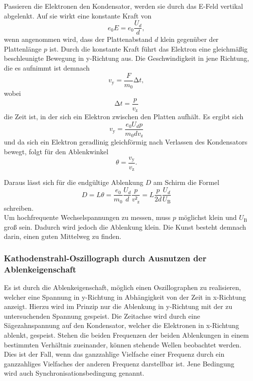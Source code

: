 Passieren die Elektronen den Kondensator, werden sie durch das E-Feld vertikal abgelenkt.
Auf sie wirkt eine konstante Kraft von
\begin{equation}
  e_0 E = e_0 \frac{U_{d}}{d},
\end{equation}
wenn angenommen wird, dass der Plattenabstand $d$ klein gegenüber der Plattenlänge $p$ ist.
Durch die konstante Kraft führt das Elektron eine gleichmäßig beschleunigte Bewegung in y-Richtung aus.
Die Geschwindigkeit in jene Richtung, die es aufnimmt ist demnach
\begin{equation}
  v_{\text{y}} = \frac{F}{m_0} \increment{t},
\end{equation}
wobei
\begin{equation}
  \increment{t} = \frac{p}{v_{\text{z}}}
\end{equation}
die Zeit ist, in der sich ein Elektron zwischen den Platten aufhält.
Es ergibt sich
\begin{equation}
  v_{\text{y}} = \frac{e_0 U_d p}{m_0 d v_{\text{z}}}
\end{equation}
und da sich ein Elektron geradlinig gleichförmig nach Verlassen des Kondensators bewegt, folgt für den Ablenkwinkel
\begin{equation}
  \theta = \frac{v_{\text{y}}}{v_{\text{z}}}.
\end{equation}

Daraus lässt sich für die endgültige Ablenkung $D$ am Schirm die Formel
\begin{equation}
  D = L \theta = \frac{e_0}{m_0} \frac{U_d}{d} \frac{p}{v²_{\text{z}}} = L \frac{p}{2d} \frac{U_d}{U_{\text{B}}}
\end{equation}
schreiben.\\
Um hochfrequente Wechselspannungen zu messen, muss $p$ möglichst klein und $U_{\text{B}}$ groß sein.
Dadurch wird jedoch die Ablenkung klein.
Die Kunst besteht demnach darin, einen guten Mittelweg zu finden.

\subsubsection{Kathodenstrahl-Oszillograph durch Ausnutzen der Ablenkeigenschaft}
Es ist durch die Ablenkeigenschaft, möglich einen Oszillographen zu realisieren, welcher eine Spannung in y-Richtung in Abhängigkeit von der Zeit in x-Richtung anzeigt.
Hierzu wird im Prinzip nur die Ablenkung in y-Richtung mit der zu untersuchenden Spannung gespeist.
Die Zeitachse wird durch eine Sägezahnspannung auf den Kondensator, welcher die Elektronen in x-Richtung ablenkt, gespeist.
Stehen die beiden Frequenzen der beiden Ablenkungen in einem bestimmten Verhältnis zueinander, können stehende Wellen beobachtet werden.
Dies ist der Fall, wenn das ganzzahlige Vielfache einer Frequenz durch ein ganzzahliges Vielfaches der anderen Frequenz darstellbar ist.
Jene Bedingung wird auch Synchronisationsbedingung genannt.

